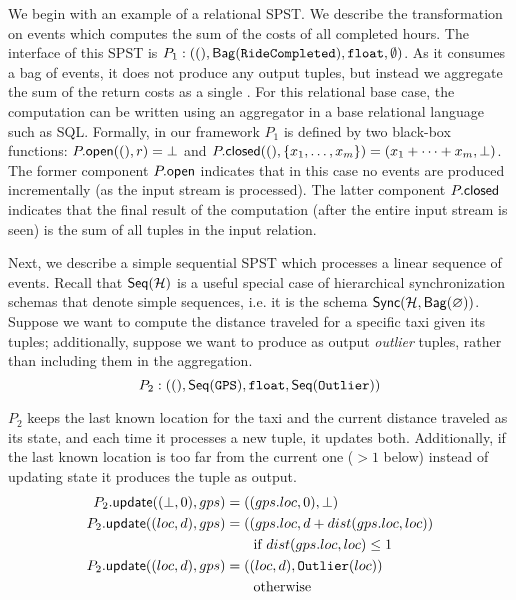 We begin with an example of a relational SPST.
We describe the transformation on 
events which computes the sum of the costs of all completed hours.
The interface of this SPST is $
P_1: ((), \mathsf{Bag}({ \texttt{RideCompleted} }), \texttt{float}, \emptyset)$.
As it consumes a bag of  events,
it does not produce any output tuples, but instead we aggregate the sum of the return
costs as a single .
For this relational base case,
the computation can be written using an aggregator in a base relational language
such as SQL.
Formally, in our framework $P_1$ is defined by two black-box functions:
${P}.{\mathsf{open}}((), r) = \bot$
and ${P}.{\mathsf{closed}}((), \{x_1, \ldots, x_m\}) = (x_1 + \cdots + x_m, \bot)$.
The former component ${P}.{\mathsf{open}}$
indicates that in this case no events are produced incrementally
(as the input stream is processed).
The latter component ${P}.{\mathsf{closed}}$
indicates that the final result of the computation (after the entire input stream is seen)
is the sum of all tuples in the input relation.

Next, we describe a simple sequential SPST
which processes a linear sequence of 
events.
Recall that $\mathsf{Seq}({\mathcal{H}})$ is a useful special case of hierarchical synchronization schemas
that denote simple sequences, i.e. it is the schema $\mathsf{Sync}({\mathcal{H}}, \mathsf{Bag}({\varnothing}))$.
Suppose we want to compute the distance traveled for a specific taxi given its  tuples;
additionally,
suppose we want to produce as output \emph{outlier} 
tuples, rather than including them in the aggregation.
\[
P_2: ((),
    \mathsf{Seq}({ \texttt{GPS} }),
    \texttt{float},
    \mathsf{Seq}({ \texttt{Outlier} }))
\]


$P_2$ keeps the last known location for the taxi and the current distance traveled as its state, and each time it processes a new  tuple, it updates both.
Additionally, if the last known location is too far from the current one
($> 1$ below)
instead of updating state it produces the tuple as output.
\begin{align*}
{P_2}.{\mathsf{update}}((\bot, 0), gps)
    &= (( gps.loc, 0), \bot) \\
{P_2}.{\mathsf{update}}((loc, d), gps)
    &= (( gps.loc, d + dist(gps.loc, loc)) \\
    &\quad\quad\text{if } dist(gps.loc, loc) \le 1 \\
{P_2}.{\mathsf{update}}((loc, d), gps)
    &= (( loc, d), \texttt{Outlier}(loc)) \\
    &\quad\quad\text{otherwise}
\end{align*}

